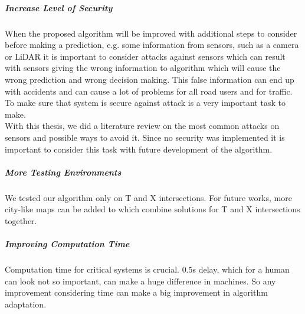 \subparagraph{Increase Level of Security}

When the proposed algorithm will be improved with additional steps to consider before making a prediction, e.g. some information from sensors, such as a camera or \gls{LiDAR} it is important to consider attacks against sensors which can result with sensors giving the wrong information to algorithm which will cause the wrong prediction and wrong decision making. This false information can end up with accidents and can cause a lot of problems for all road users and for traffic. To make sure that system is secure against attack is a very important task to make. \\
With this thesis, we did a literature review on the most common attacks on sensors and possible ways to avoid it. Since no security was implemented it is important to consider this task with future development of the algorithm. 

\subparagraph{More Testing Environments}

We tested our algorithm only on T and X intersections. For future works, more city-like maps can be added to which combine solutions for T and X intersections together.

\subparagraph{Improving Computation Time}

Computation time for critical systems is crucial. $0.5$s delay, which for a human can look not so important, can make a huge difference in machines. So any improvement considering time can make a big improvement in algorithm adaptation. 
